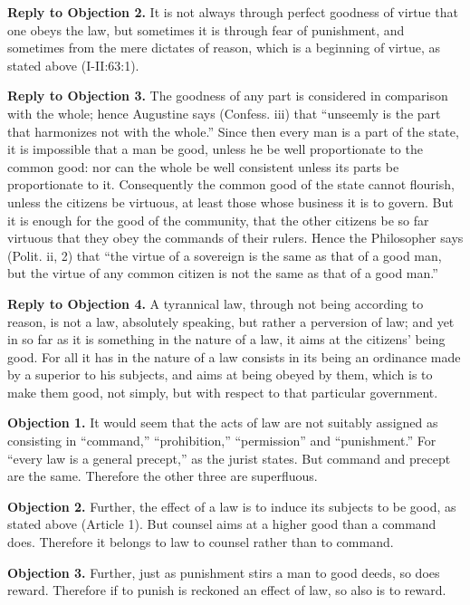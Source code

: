 \textbf{Reply to Objection 2.} It is not always through perfect goodness of virtue that one obeys the law, but sometimes it is through fear of punishment, and sometimes from the mere dictates of reason, which is a beginning of virtue, as stated above (I-II:63:1).

\textbf{Reply to Objection 3.} The goodness of any part is considered in comparison with the whole; hence Augustine says (Confess. iii) that ``unseemly is the part that harmonizes not with the whole.'' Since then every man is a part of the state, it is impossible that a man be good, unless he be well proportionate to the common good: nor can the whole be well consistent unless its parts be proportionate to it. Consequently the common good of the state cannot flourish, unless the citizens be virtuous, at least those whose business it is to govern. But it is enough for the good of the community, that the other citizens be so far virtuous that they obey the commands of their rulers. Hence the Philosopher says (Polit. ii, 2) that ``the virtue of a sovereign is the same as that of a good man, but the virtue of any common citizen is not the same as that of a good man.''

\textbf{Reply to Objection 4.} A tyrannical law, through not being according to reason, is not a law, absolutely speaking, but rather a perversion of law; and yet in so far as it is something in the nature of a law, it aims at the citizens' being good. For all it has in the nature of a law consists in its being an ordinance made by a superior to his subjects, and aims at being obeyed by them, which is to make them good, not simply, but with respect to that particular government.


\textbf{Objection 1.} It would seem that the acts of law are not suitably assigned as consisting in ``command,'' ``prohibition,'' ``permission'' and ``punishment.'' For ``every law is a general precept,'' as the jurist states. But command and precept are the same. Therefore the other three are superfluous.

\textbf{Objection 2.} Further, the effect of a law is to induce its subjects to be good, as stated above (Article 1). But counsel aims at a higher good than a command does. Therefore it belongs to law to counsel rather than to command.

\textbf{Objection 3.} Further, just as punishment stirs a man to good deeds, so does reward. Therefore if to punish is reckoned an effect of law, so also is to reward.

